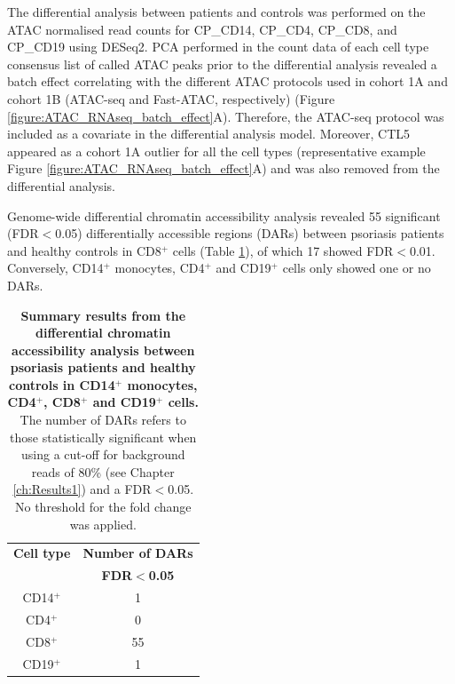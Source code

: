 The differential analysis between patients and controls was performed on the ATAC normalised read counts for CP\_CD14, CP\_CD4, CP\_CD8, and CP\_CD19 using DESeq2. PCA performed in the count data of each cell type consensus list of called ATAC peaks prior to the differential analysis revealed a batch effect correlating with the different ATAC protocols used in cohort 1A and cohort 1B (ATAC-seq and Fast-ATAC, respectively) (Figure \ref{figure:ATAC_RNAseq_batch_effect}A). Therefore, the ATAC-seq protocol was included as a covariate in the differential analysis model. Moreover, CTL5 appeared as a cohort 1A outlier for all the cell types (representative example Figure \ref{figure:ATAC_RNAseq_batch_effect}A) and was also removed from the differential analysis.

Genome-wide differential chromatin accessibility analysis revealed 55 significant (FDR$<$0.05) differentially accessible regions (DARs) between psoriasis patients and healthy controls in CD8$^+$ cells (Table \ref{tab:ATAC_PS_CTL_differential_analysis_results}), of which 17 showed FDR$<$0.01. Conversely, CD14$^+$ monocytes, CD4$^+$ and CD19$^+$ cells only showed one or no DARs. 


\begin{table}[htbp]
\centering
\begin{tabular}{@{} c c}
\toprule
\textbf{Cell type}   & \textbf{Number of DARs} \\
                     & \textbf{FDR$<$0.05}     \\
\midrule
\midrule
CD14$^+$             & 1 \\                 
CD4$^+$              & 0 \\
CD8$^+$              & 55 \\
CD19$^+$             & 1 \\
\bottomrule 
\end{tabular}
\medskip %
\caption[Summary results from the differential chromatin accessibility analysis between psoriasis patients and healthy controls in CD14$^+$ monocytes, CD4$^+$, CD8$^+$ and CD19$^+$ cells.]{\textbf{Summary results from the differential chromatin accessibility analysis between psoriasis patients and healthy controls in CD14$^+$ monocytes, CD4$^+$, CD8$^+$ and CD19$^+$ cells.} The number of DARs refers to those statistically significant when using a cut-off for background reads of 80\% (see Chapter \ref{ch:Results1}) and a FDR$<$0.05. No threshold for the fold change was applied.}
\label{tab:ATAC_PS_CTL_differential_analysis_results}
\end{table}
\bigskip %


